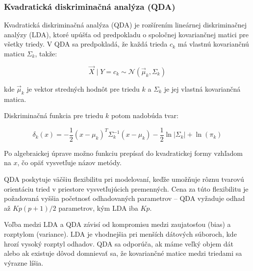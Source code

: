 \subsubsection{Kvadratická diskriminačná analýza (QDA)}
\label{subsubsec:qda}

Kvadratická diskriminačná analýza (QDA) je rozšírením lineárnej diskriminačnej analýzy (LDA), ktoré upúšťa od predpokladu o spoločnej kovariančnej matici pre všetky triedy. V QDA sa predpokladá, že každá trieda $c_k$ má vlastnú kovariančnú maticu $\Sigma_k$, takže:

\begin{equation}
\vec{X} \mid Y = c_k \sim \mathcal{N}(\vec{\mu}_k, \Sigma_k)
\end{equation}

kde $\vec{\mu}_k$ je vektor stredných hodnôt pre triedu $k$ a $\Sigma_k$ je jej vlastná kovariančná matica.

Diskriminačná funkcia pre triedu $k$ potom nadobúda tvar:

\begin{equation}
\delta_k(x) = -\frac{1}{2} (x - \mu_k)^T \Sigma_k^{-1} (x - \mu_k) - \frac{1}{2} \ln|\Sigma_k| + \ln(\pi_k)
\end{equation}

Po algebraickej úprave možno funkciu prepísať do kvadratickej formy vzhľadom na $x$, čo opäť vysvetľuje názov metódy.

QDA poskytuje väčšiu flexibilitu pri modelovaní, keďže umožňuje rôznu tvarovú orientáciu tried v priestore vysvetľujúcich premenných. Cena za túto flexibilitu je požadovaná vyššia početnosť odhadovaných parametrov – QDA vyžaduje odhad až $Kp(p+1)/2$ parametrov, kým LDA iba $Kp$.

Voľba medzi LDA a QDA závisí od kompromisu medzi zaujatosťou (bias) a rozptylom (variance). LDA je vhodnejšia pri menších dátových súboroch, kde hrozí vysoký rozptyl odhadov. QDA sa odporúča, ak máme veľký objem dát alebo ak existuje dôvod domnievať sa, že kovariančné matice medzi triedami sa výrazne líšia.

